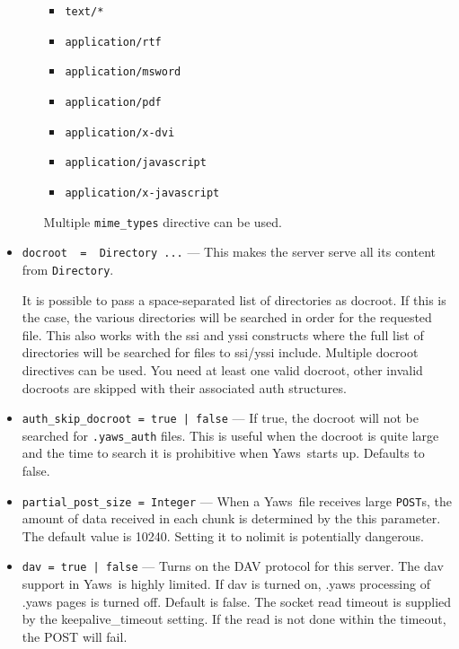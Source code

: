 \documentclass[11pt,oneside,english]{book}
\newcommand{\Yaws}            %
        {{\sc Yaws}}
\begin{document}
\begin{itemize}
\begin{itemize}
                    \begin{itemize}
                    \item \verb+text/*+
                    \item \verb+application/rtf+
                    \item \verb+application/msword+
                    \item \verb+application/pdf+
                    \item \verb+application/x-dvi+
                    \item \verb+application/javascript+
                    \item \verb+application/x-javascript+
                    \end{itemize}
                    Multiple \verb+mime_types+ directive can be used.
             \end{itemize}

\item       \verb+docroot  =  Directory ...+ ---
              This makes the server serve all its content from
              \verb+Directory+.

              It is possible to pass a space-separated list of directories as
              docroot. If this is the case, the various directories will be
              searched in order for the requested file. This also works with the
              ssi and yssi constructs where the full list of directories will be
              searched for files to ssi/yssi include. Multiple docroot
              directives can be used.  You need at least one valid docroot,
              other invalid docroots are skipped with their associated auth
              structures.

\item       \verb+auth_skip_docroot = true | false+ ---
              If true, the docroot will not be searched for
              \verb+.yaws_auth+ files. This is useful when the
              docroot is quite large and the time to search it is
              prohibitive when \Yaws\  starts up. Defaults to false.

\item       \verb+partial_post_size = Integer+ ---
              When a \Yaws\ file receives large \verb+POST+s, the amount of data
              received in each chunk is determined by the this parameter.  The
              default value is 10240. Setting it to nolimit is potentially
              dangerous.

\item       \verb+dav = true | false+ ---
              Turns on the DAV protocol for this server. The dav support in
              \Yaws\ is highly limited. If dav is turned on, .yaws processing of
              .yaws pages is turned off. Default is false. The socket read
              timeout is supplied by the keepalive\_timeout setting. If the read
              is not done within the timeout, the POST will fail.


\end{itemize}
\end{document}
